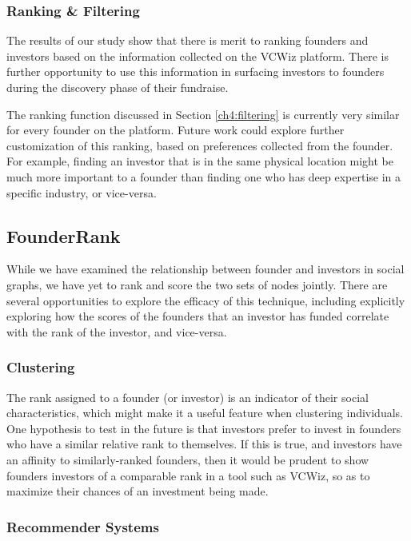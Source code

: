 \subsubsection{Ranking \& Filtering}

The results of our study show that there is merit to ranking founders and investors based on the information collected on the VCWiz platform. There is further opportunity to use this information in surfacing investors to founders during the discovery phase of their fundraise.

The ranking function discussed in Section \ref{ch4:filtering} is currently very similar for every founder on the platform. Future work could explore further customization of this ranking, based on preferences collected from the founder. For example, finding an investor that is in the same physical location might be much more important to a founder than finding one who has deep expertise in a specific industry, or vice-versa.

\subsection{FounderRank}

While we have examined the relationship between founder and investors in social graphs, we have yet to rank and score the two sets of nodes jointly. There are several opportunities to explore the efficacy of this technique, including explicitly exploring how the scores of the founders that an investor has funded correlate with the rank of the investor, and vice-versa.

\subsubsection{Clustering}

The rank assigned to a founder (or investor) is an indicator of their social characteristics, which might make it a useful feature when clustering individuals. One hypothesis to test in the future is that investors prefer to invest in founders who have a similar relative rank to themselves. If this is true, and investors have an affinity to similarly-ranked founders, then it would be prudent to show founders investors of a comparable rank in a tool such as VCWiz, so as to maximize their chances of an investment being made.

\subsubsection{Recommender Systems}

